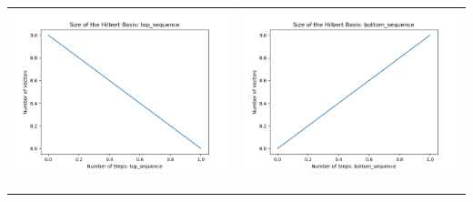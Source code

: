 \documentclass[10pt]{article}
\begin{document}
\begin{tabular}{c|c}
\begin{minipage}{.45\textwidth}
\includegraphics[width=\textwidth]{"DATA/5d/6 generators 1 bound C/top_sequence SIZE"}
\end{minipage} &
\begin{minipage}{.45\textwidth}
\includegraphics[width=\textwidth]{"DATA/5d/6 generators 1 bound C bottomup/bottom_sequence SIZE"}
\end{minipage} \\ \\
\hline \\\begin{minipage}{.45\textwidth}

\end{minipage}
\end{tabular}
\end{document}
